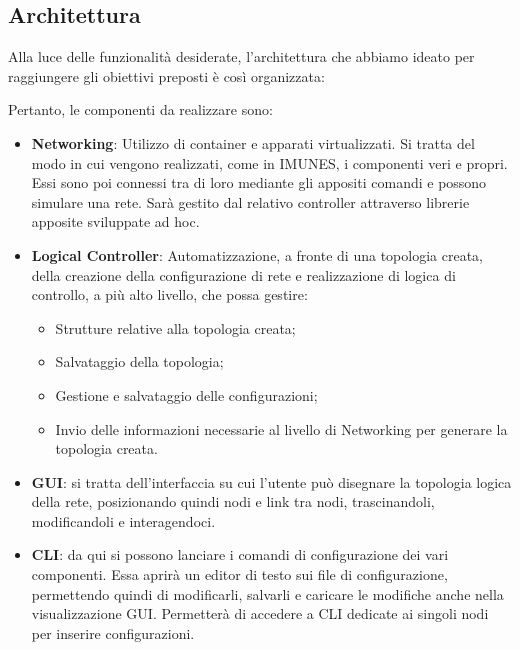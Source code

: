 \subsection{Architettura}
Alla luce delle funzionalità desiderate, l'architettura che abbiamo ideato per raggiungere gli obiettivi preposti è così organizzata: 
\begin{center}
\end{center}
Pertanto, le componenti da realizzare sono:
\begin{itemize}
    \item \textbf{Networking}: Utilizzo di container e apparati virtualizzati. Si tratta del modo in cui vengono realizzati, come in IMUNES, i componenti veri e propri. Essi sono poi connessi tra di loro mediante gli appositi comandi e possono simulare una rete. Sarà gestito dal relativo controller attraverso librerie apposite sviluppate ad hoc.
    \item \textbf{Logical Controller}: Automatizzazione, a fronte di una topologia creata, della creazione della configurazione di rete e realizzazione di logica di controllo, a più alto livello, che possa gestire:
          \begin{itemize}
              \item Strutture relative alla topologia creata;
              \item Salvataggio della topologia;
              \item Gestione e salvataggio delle configurazioni;
              \item Invio delle informazioni necessarie al livello di Networking per generare la topologia creata.
          \end{itemize}
    \item \textbf{GUI}: si tratta dell'interfaccia su cui l'utente può disegnare la topologia logica della rete, posizionando quindi nodi e link tra nodi, trascinandoli, modificandoli e interagendoci.
    \item \textbf{CLI}: da qui si possono lanciare i comandi di configurazione dei vari componenti. Essa aprirà un editor di testo sui file di configurazione, permettendo quindi di modificarli, salvarli e caricare le modifiche anche nella visualizzazione GUI. Permetterà di accedere a CLI dedicate ai singoli nodi per inserire configurazioni.
\end{itemize}



\newpage
